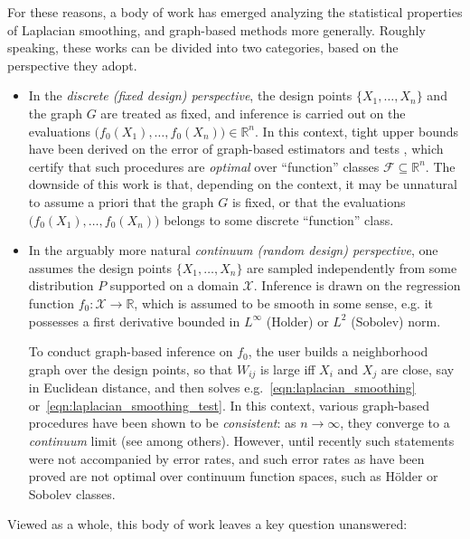 \documentclass[twoside]{article}
\newcommand{\Reals}{\mathbb{R}}
\newcommand{\1}{\mathbf{1}}
\newcommand{\Xset}{\mathcal{X}}
\newcommand{\Leb}{L}
\newcommand{\mc}[1]{\mathcal{#1}}
\theoremstyle{definition}
\theoremstyle{remark}
\begin{document}
For these reasons, a body of work has emerged analyzing the statistical properties of Laplacian smoothing, and graph-based methods more generally. Roughly speaking, these works can be divided into two categories, based on the perspective they adopt. 
\begin{itemize}
	\item In the \emph{discrete (fixed design) perspective}, the design points $\{X_1,\ldots,X_n\}$ and the graph $G$ are treated as fixed, and inference is carried out on the evaluations $\bigl(f_0(X_1),\ldots,f_0(X_n)\bigr) \in \Reals^n$. In this context, tight upper bounds have been derived on the error of graph-based estimators \citep{wang2016, sadhanala16,sadhanala17,kirichenko2017,kirichenko2018} and tests \citep{sharpnack2013,sharpnack2013b,sharpnack2015}, which certify that such procedures are \emph{optimal} over ``function'' classes $\mc{F} \subseteq \Reals^n$. The downside of this work is that, depending on the context, it may be unnatural to assume a priori that the graph $G$ is fixed, or that the evaluations $\bigl(f_0(X_1),\ldots,f_0(X_n)\bigr)$ belongs to some discrete ``function'' class.
	\item In the arguably more natural \emph{continuum (random design) perspective},  one assumes the design points $\{X_1,\ldots,X_n\}$ are sampled independently from some distribution $P$ supported on a domain $\Xset$. Inference is drawn on the regression function $f_0: \Xset \to \Reals$, which is assumed to be smooth in some sense, e.g. it possesses a first derivative bounded in $L^{\infty}$ (Holder) or $\Leb^2$ (Sobolev) norm.
	
	To conduct graph-based inference on $f_0$, the user builds a neighborhood graph over the design points, so that $W_{ij}$ is large iff $X_i$ and $X_j$ are close, say in Euclidean distance, and then solves e.g.~\eqref{eqn:laplacian_smoothing} or~\eqref{eqn:laplacian_smoothing_test}. In this context, various graph-based procedures have been shown to be \emph{consistent}: as $n \to \infty$, they converge to a \emph{continuum} limit (see \citep{belkin07,trillos2018,vonluxburg2008} among others). However, until recently such statements were not accompanied by error rates, and such error rates as have been proved \citep{lee2016,trillos2020} are not optimal over continuum function spaces, such as H\"{o}lder or Sobolev classes. 
\end{itemize}
Viewed as a whole, this body of work leaves a key question unanswered: 
\end{document}
